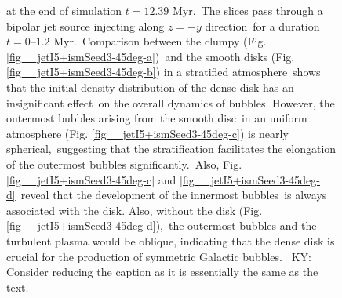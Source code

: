 \documentclass[fleqn,usenatbib,useAMS]{mnras}
\begin{document}
\begin{figure}
{             at the end of simulation $t=12.39$ Myr.\
             The slices pass through a bipolar jet source injecting along $z=-y$ direction\
             for a duration $t=0$--$1.2$ Myr.\
             Comparison between the clumpy (Fig. \ref{fig__jetI5+ismSeed3-45deg-a})\
             and the smooth disks (Fig. \ref{fig__jetI5+ismSeed3-45deg-b}) in a stratified atmosphere\
             shows that the initial density distribution of the dense disk has an insignificant effect\
             on the overall dynamics of bubbles. However, the outermost bubbles arising from the smooth disc\
             in an uniform atmosphere (Fig. \ref{fig__jetI5+ismSeed3-45deg-c}) is nearly spherical,\
             suggesting that the stratification facilitates the elongation of the outermost bubbles significantly.\
             Also, Fig. \ref{fig__jetI5+ismSeed3-45deg-c} and \ref{fig__jetI5+ismSeed3-45deg-d}\
             reveal that the development of the innermost bubbles\
             is always associated with the disk. Also, without the disk (Fig. \ref{fig__jetI5+ismSeed3-45deg-d}),\
             the outermost bubbles and the turbulent plasma would be oblique,
             indicating that the dense disk is crucial for the production of symmetric Galactic bubbles.\ {\color{red} KY: Consider reducing the caption as it is essentially the same as the text.}
      }
      \label{fig__jetI5+ismSeed3-45deg}
 \end{figure}%
\end{document}
